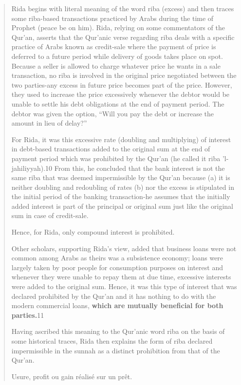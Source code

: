 \begin{quote}
Rida begins with literal meaning of the word riba (excess) and then traces some riba-based transactions practiced by Arabs during the time of Prophet (peace be on him). Rida, relying on some commentators of the Qur'an, asserts that the Qur'anic verse regarding riba deals with a specific practice of Arabs known as credit-sale where the payment of price is deferred to a future period while delivery of goods takes place on spot. Because a seller is allowed to charge whatever price he wants in a sale transaction, no riba is involved in the original price negotiated between the two parties-any excess in future price becomes part of the price. However, they used to increase the price excessively whenever the debtor would be unable to settle his debt obligations at the end of payment period. The debtor was given the option, “Will you pay the debt or increase the amount in lieu of delay?”

For Rida, it was this excessive rate (doubling and multiplying) of interest in debt-based transactions added to the original sum at the end of payment period which was prohibited by the Qur'an (he called it riba 'l-jahiliyyah).10 From this, he concluded that the bank interest is not the same riba that was deemed impermissible by the Qur'an because (a) it is neither doubling and redoubling of rates (b) nor the excess is stipulated in the initial period of the banking transaction-he assumes that the initially added interest is part of the principal or original sum just like the original sum in case of credit-sale. 
\begin{Synthesis}
Hence, for Rida, only compound interest is prohibited.
\end{Synthesis} 

Other scholars, supporting Rida's view, added that business loans were not common among Arabs as theirs was a subsistence economy; loans were largely taken by poor people for consumption purposes on interest and whenever they were unable to repay them at due time, excessive interests were added to the original sum. Hence, it was this type of interest that was declared prohibited by the Qur'an and it has nothing to do with the modern commercial loans, \textbf{which are mutually beneficial for both parties.}11

Having ascribed this meaning to the Qur'anic word riba on the basis of some historical traces, Rida then explains the form of riba declared impermissible in the sunnah as a distinct prohibition from that of the Qur'an.
\begin{Def}[Riba] Usure, profit ou gain réalisé sur un prêt.
\end{Def}


\end{quote}
